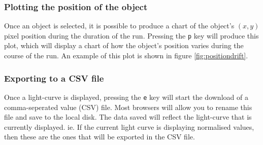 \subsubsection{Plotting the position of the object}
Once an object is selected, it is possible to produce a chart of the object's $(x, y)$ pixel position during the duration of the run. Pressing the \texttt{p} key will produce this plot, which will display a chart of how the object's position varies during the course of the run. An example of this plot is shown in figure \ref{fig:positiondrift}.

\subsubsection{Exporting to a CSV file}
Once a light-curve is displayed, pressing the \texttt{e} key will start the download of a comma-seperated value (CSV) file. Most browsers will allow you to rename this file and save to the local disk. The data saved will reflect the light-curve that is currently displayed. ie. If the current light curve is displaying normalised values, then these are the ones that will be exported in the CSV file.

